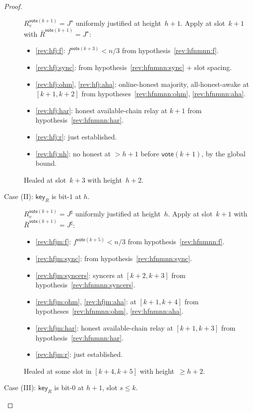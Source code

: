 \documentclass{article}
\newcommand{\key}{\mathsf{key}}
\newcommand{\vote}{\mathsf{vote}}
\newcommand{\comm}[1]{\bar{#1}}
\theoremstyle{plain}
\theoremstyle{definition}
\theoremstyle{remark}
\newcommand{\OHM}{online-honest majority\xspace}
\newcommand{\HAR}{honest available-chain relay\xspace}
\newcommand{\AHA}{all-honest-awake\xspace}
\begin{document}
\begin{proof}
\begin{description}
$R_v^{\vote(k+1)} = J^\star$ uniformly justified at height~$h+1$. Apply  at slot~$k+1$ with $\comm{R}^{\vote(k+1)} = J^\star$:
\begin{itemize}
  \item \ref{rev:hfj:f}: $f^{\vote(k+3)} < n/3$ from hypothesis~\ref{rev:hfnmnn:f}.
  \item \ref{rev:hfj:sync}: from hypothesis~\ref{rev:hfnmnn:sync} + slot spacing.
  \item \ref{rev:hfj:ohm}, \ref{rev:hfj:aha}: \OHM, \AHA at $[k+1, k+2]$ from hypotheses~\ref{rev:hfnmnn:ohm}, \ref{rev:hfnmnn:aha}.
  \item \ref{rev:hfj:har}: \HAR at $k+1$ from hypothesis~\ref{rev:hfnmnn:har}.
  \item \ref{rev:hfj:r}: just established.
  \item \ref{rev:hfj:nh}: no honest at $> h+1$ before $\vote(k+1)$, by the global bound.
\end{itemize}
Healed at slot~$k+3$ with height~$h+2$.

\item[{Case (II): $\key_R$ is bit-$1$ at $h$.}]\hfill

$R_v^{\vote(k+1)} = J^\sharp$ uniformly justified at height~$h$. Apply  at slot~$k+1$ with $\comm{R}^{\vote(k+1)} = J^\sharp$:
\begin{itemize}
  \item \ref{rev:hfjm:f}: $f^{\vote(k+5)} < n/3$ from hypothesis~\ref{rev:hfnmnn:f}.
  \item \ref{rev:hfjm:sync}: from hypothesis~\ref{rev:hfnmnn:sync}.
  \item \ref{rev:hfjm:syncers}: syncers at $[k+2, k+3]$ from hypothesis~\ref{rev:hfnmnn:syncers}.
  \item \ref{rev:hfjm:ohm}, \ref{rev:hfjm:aha}: at $[k+1, k+4]$ from hypotheses~\ref{rev:hfnmnn:ohm}, \ref{rev:hfnmnn:aha}.
  \item \ref{rev:hfjm:har}: \HAR at $[k+1, k+3]$ from hypothesis~\ref{rev:hfnmnn:har}.
  \item \ref{rev:hfjm:r}: just established.
\end{itemize}
Healed at some slot in $[k+4, k+5]$ with height~$\geq h+2$.

\item[{Case (III): $\key_R$ is bit-$0$ at $h+1$, slot $s \leq k$.}]\hfill


\end{description}
\end{proof}
\end{document}

